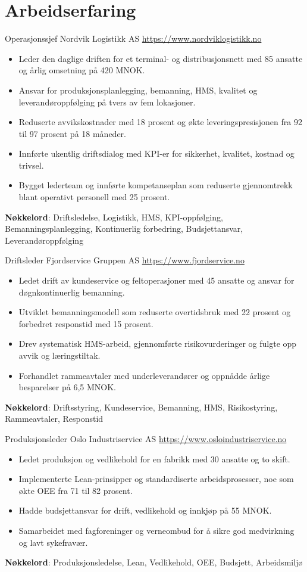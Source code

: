 \documentclass[a4paper, serif, 10pt]{moderncv}
\begin{document}
\section{Arbeidserfaring}

        {Operasjonssjef}
        {Nordvik Logistikk AS}
        {\url{https://www.nordviklogistikk.no}}
        {}
        {\begin{itemize}
\item Leder den daglige driften for et terminal- og distribusjonsnett med 85 ansatte og årlig omsetning på 420 MNOK.
\item Ansvar for produksjonsplanlegging, bemanning, HMS, kvalitet og leverandøroppfølging på tvers av fem lokasjoner.
\item Reduserte avvikskostnader med 18 prosent og økte leveringspresisjonen fra 92 til 97 prosent på 18 måneder.
\item Innførte ukentlig driftsdialog med KPI-er for sikkerhet, kvalitet, kostnad og trivsel.
\item Bygget lederteam og innførte kompetanseplan som reduserte gjennomtrekk blant operativt personell med 25 prosent.
\end{itemize}
\textbf{Nøkkelord}: Driftsledelse, Logistikk, HMS, KPI-oppfølging, Bemanningsplanlegging, Kontinuerlig forbedring, Budsjettansvar, Leverandøroppfølging}

        {Driftsleder}
        {Fjordservice Gruppen AS}
        {\url{https://www.fjordservice.no}}
        {}
        {\begin{itemize}
\item Ledet drift av kundeservice og feltoperasjoner med 45 ansatte og ansvar for døgnkontinuerlig bemanning.
\item Utviklet bemanningsmodell som reduserte overtidsbruk med 22 prosent og forbedret responstid med 15 prosent.
\item Drev systematisk HMS-arbeid, gjennomførte risikovurderinger og fulgte opp avvik og læringstiltak.
\item Forhandlet rammeavtaler med underleverandører og oppnådde årlige besparelser på 6,5 MNOK.
\end{itemize}
\textbf{Nøkkelord}: Driftsstyring, Kundeservice, Bemanning, HMS, Risikostyring, Rammeavtaler, Responstid}

        {Produksjonsleder}
        {Oslo Industriservice AS}
        {\url{https://www.osloindustriservice.no}}
        {}
        {\begin{itemize}
\item Ledet produksjon og vedlikehold for en fabrikk med 30 ansatte og to skift.
\item Implementerte Lean-prinsipper og standardiserte arbeidsprosesser, noe som økte OEE fra 71 til 82 prosent.
\item Hadde budsjettansvar for drift, vedlikehold og innkjøp på 55 MNOK.
\item Samarbeidet med fagforeninger og verneombud for å sikre god medvirkning og lavt sykefravær.
\end{itemize}
\textbf{Nøkkelord}: Produksjonsledelse, Lean, Vedlikehold, OEE, Budsjett, Arbeidsmiljø}
\end{document}

